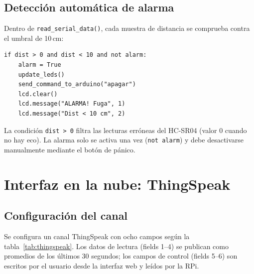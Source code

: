 \documentclass[12pt, a4paper]{article}
\begin{document}
\subsection{Detección automática de alarma}

Dentro de \texttt{read\_serial\_data()}, cada muestra de distancia se comprueba
contra el umbral de 10\,cm:

\begin{lstlisting}[style=python, caption={Detección automática de fuga}]
if dist > 0 and dist < 10 and not alarm:
    alarm = True
    update_leds()
    send_command_to_arduino("apagar")
    lcd.clear()
    lcd.message("ALARMA! Fuga", 1)
    lcd.message("Dist < 10 cm", 2)
\end{lstlisting}

La condición \texttt{dist > 0} filtra las lecturas erróneas del HC-SR04 (valor 0
cuando no hay eco). La alarma solo se activa una vez (\texttt{not alarm}) y debe
desactivarse manualmente mediante el botón de pánico.

\newpage

\section{Interfaz en la nube: ThingSpeak}
\label{sec:thingspeak}

\subsection{Configuración del canal}

Se configura un canal ThingSpeak con ocho campos según la tabla~\ref{tab:thingspeak}.
Los datos de lectura (fields 1--4) se publican como promedios de los últimos 30
segundos; los campos de control (fields 5--6) son escritos por el usuario desde la
interfaz web y leídos por la RPi.
\end{document}

